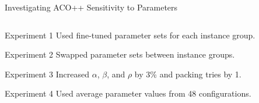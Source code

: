 \documentclass[aspectratio=169]{beamer}
\begin{document}
\begin{frame}{Investigating ACO++ Sensitivity to Parameters}
    \begin{columns}
        \begin{column}{0.45\textwidth}
            \footnotesize
            \begin{block}{Experiment 1}
                Used fine-tuned parameter sets for each instance group.
            \end{block}
            \begin{block}{Experiment 2}
                Swapped parameter sets between instance groups.
            \end{block}
            \begin{block}{Experiment 3}
                Increased $\alpha$, $\beta$, and $\rho$ by 3\% and packing tries by 1.
            \end{block}
            \begin{block}{Experiment 4}
                Used average parameter values from 48 configurations.
            \end{block}
        \end{column}
        \begin{column}{0.45\textwidth}

\end{column}
\end{columns}
\end{frame}
\end{document}
